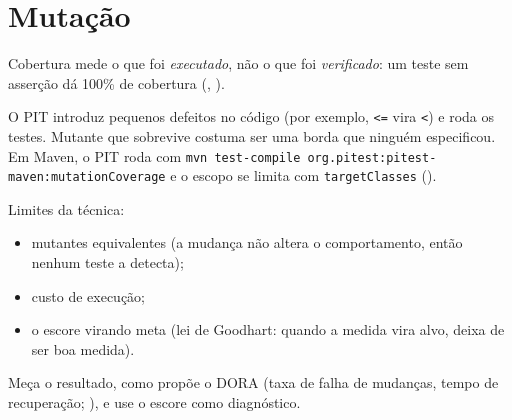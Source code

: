 \section{Mutação}

Cobertura mede o que foi \emph{executado}, não o que foi \emph{verificado}:
um teste sem asserção dá 100\% de cobertura
(, ).

O PIT introduz pequenos defeitos no código (por exemplo, \texttt{<=} vira
\texttt{<}) e roda os testes. Mutante que sobrevive costuma ser uma borda
que ninguém especificou. Em Maven, o PIT roda com
\texttt{mvn test-compile org.pitest:pitest-maven:mutationCoverage} e o
escopo se limita com \texttt{targetClasses}
().

Limites da técnica:
\begin{itemize}
\item mutantes equivalentes (a mudança não altera o comportamento, então
  nenhum teste a detecta);
\item custo de execução;
\item o escore virando meta (lei de Goodhart: quando a medida vira alvo,
  deixa de ser boa medida).
\end{itemize}

Meça o resultado, como propõe o DORA (taxa de falha de mudanças, tempo de
recuperação; ), e use o escore como diagnóstico.
